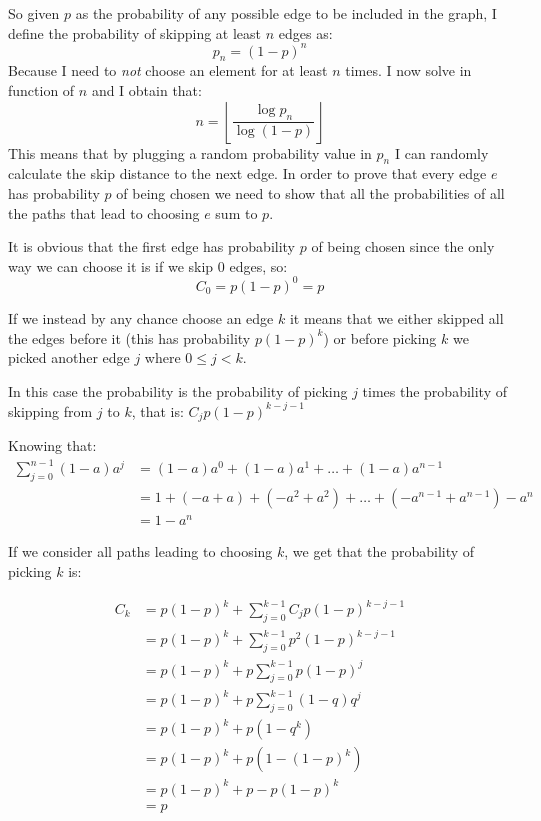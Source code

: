 \documentclass{article}
\begin{document}
So given $p$ as the probability of any possible edge to be included in the graph, I define the probability of skipping at least $n$ edges as:
$$p_n = (1-p)^n$$ 
Because I need to \emph{not} choose an element for at least $n$ times. I now solve in function of $n$ and I obtain that:
$$n = \left\lfloor\frac{\log{p_n}}{\log{(1-p)}}\right\rfloor$$
This means that by plugging a random probability value in $p_n$ I can randomly calculate the skip distance to the next edge.
In order to prove that every edge $e$ has probability $p$ of being chosen we need to show that all the probabilities of all the paths that lead to choosing $e$ sum to $p$.

It is obvious that the first edge has probability $p$ of being chosen since the only way we can choose it is if we skip $0$ edges, so: 
$$C_0 = p(1-p)^0 = p$$

If we instead by any chance choose an edge $k$ it means that we either skipped all the edges before it (this has probability $p(1-p)^k$) or before picking $k$ we picked another edge $j$ where $0 \leq j < k$. 

In this case the probability is the probability of picking $j$ times the probability of skipping from $j$ to $k$, that is: $C_jp(1-p)^{k-j-1}$

Knowing that:
\begin{align*}
\sum_{j=0}^{n-1} (1-a)a^j &= (1-a)a^0 + (1-a)a^1 + \ldots + (1-a)a^{n-1}
\\ &= 1+(- a + a)+(- a^2 + a^2) + \ldots + (- a^{n-1}+ a^{n-1}) - a^n 
\\ &= 1 - a^n
\end{align*}

If we consider all paths leading to choosing $k$, we get that the probability of picking $k$ is:

\begin{align*}
C_k &= p(1-p)^k + \sum_{j=0}^{k-1} C_j p(1-p)^{k-j-1}
\\ &= p(1-p)^k + \sum_{j=0}^{k-1} p^2(1-p)^{k-j-1} \tag{Assume by induction that $C_j = p$}
\\ &= p(1-p)^k + p\sum_{j=0}^{k-1} p(1-p)^{j}
\\ &= p(1-p)^k + p\sum_{j=0}^{k-1} (1-q)q^{j} \tag{With $q=(1-p)$}
\\ &= p(1-p)^k + p(1 - q^k)
\\ &= p(1-p)^k + p(1 - (1-p)^k)
\\ &= p(1-p)^k + p - p(1-p)^k
\\ &= p
\end{align*}
\end{document}
